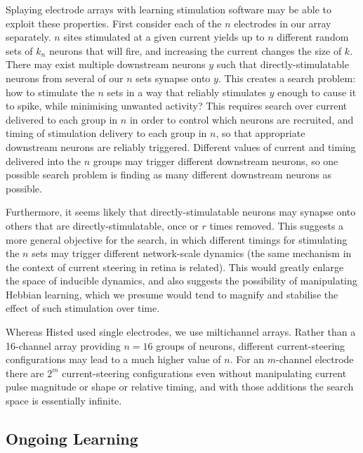 \documentclass[10pt,letterpaper]{article}
\let\oldmarginpar\marginpar
\renewcommand{\marginpar}[1]{\oldmarginpar{\linespread{1}\scriptsize{#1}}}
\begin{document}
Splaying electrode arrays with learning stimulation software may be
able to exploit these properties.  First consider each of the $n$
electrodes in our array separately.  $n$ sites stimulated at a given
current yields up to $n$ different random sets of $k_n$ neurons that
will fire, and increasing the current changes the size of $k$.  There
may exist multiple downstream neurons $y$ such that
directly-stimulatable neurons from several of our $n$ sets synapse
onto $y$.  This creates a search problem: how to stimulate the $n$
sets in a way that reliably stimulates $y$ enough to cause it to
spike, while minimising unwanted activity? This requires search over
current delivered to each group in $n$ in order to control which
neurons are recruited, and timing of stimulation delivery to each
group in $n$, so that appropriate downstream neurons are reliably
triggered.  Different values of current and timing delivered into the
$n$ groups may trigger different downstream neurons, so one possible
search problem is finding as many different downstream neurons as
possible.

Furthermore, it seems likely that directly-stimulatable neurons may
synapse onto others that are directly-stimulatable, once or $r$ times
removed. This suggests a more general objective for the search, in
which different timings for stimulating the $n$ sets may trigger
different network-scale dynamics (the same mechanism in the context of
current steering in retina\cite{Jepson2014steering_in_retina} is
related).\marginpar{What does that mean?} This would greatly enlarge the space of inducible dynamics, and
also suggests the possibility of manipulating Hebbian learning, which we
presume would tend to magnify and stabilise the effect of such
stimulation over time.\marginpar{Wild speculation. Too much so?}

Whereas Histed used single electrodes, we use miltichannel arrays.
Rather than a 16-channel array providing $n=16$ groups of neurons,
different current-steering configurations may lead to a much higher
value of $n$.  For an $m$-channel electrode there are $2^m$
current-steering configurations even without manipulating current
pulse magnitude or shape or relative timing, and with those additions the search space
is essentially infinite.

\subsection{Ongoing Learning}
\end{document}
